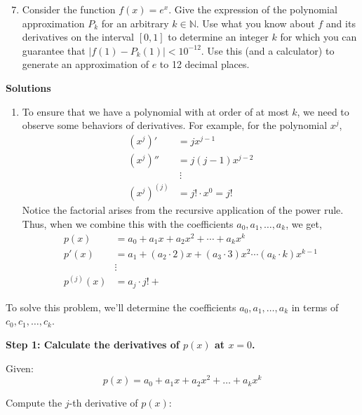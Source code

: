 \documentclass[12pt]{article}
\newcommand{\N}{\ensuremath{\mathbb{N}}}
\begin{document}
\begin{enumerate}
    \setcounter{enumi}{6}
    \item Consider the function \(f(x) = e^{x}\). Give the expression of the polynomial approximation \(P_{k}\) for an arbitrary \(k \in \N\). Use what you know about \(f\) and its derivatives on the interval \([0,1]\) to determine an integer \(k\) for which you can guarantee that \(|f(1) - P_{k}(1)| < 10^{-12}\). Use this (and a calculator) to generate an approximation of \(e\) to 12 decimal places.
\end{enumerate}
\newpage

\begin{center}
    \textbf{Solutions}
\end{center}

\begin{enumerate}
    \item To ensure that we have a polynomial with at order of at most \(k\), we need to observe some behaviors of derivatives. For example, for the polynomial \(x^{j}\), 
    \begin{align*}
        (x^{j})' &= jx^{j - 1} \\
        (x^{j})'' &= j(j - 1)x^{j - 2} \\
        &~\vdots \\
        (x^{j})^{(j)} &= j!\cdot x^{0} = j!
    \end{align*}
    Notice the factorial arises from the recursive application of the power rule. Thus, when we combine this with the coefficients \(a_{0},a_{1},\ldots,a_{k}\), we get, 
    \begin{align*}
        p(x) &= a_0 + a_1 x + a_2 x^2 + \cdots + a_k x^k \\
        p'(x) &= a_{1} + (a_{2} \cdot 2) x + (a_{3} \cdot 3) x^{2} \cdots (a_{k} \cdot k) x^{k - 1} \\
        &\vdots \\
        p^{(j)}(x) &= a_{j} \cdot j! + 
\end{align*}
\end{enumerate}

To solve this problem, we'll determine the coefficients \( a_0, a_1, \dots, a_k \) in terms of \( c_0, c_1, \dots, c_k \).


\textbf{Step 1: Calculate the derivatives of \( p(x) \) at \( x = 0 \).}

Given:
\[
p(x) = a_0 + a_1 x + a_2 x^2 + \dots + a_k x^k
\]

Compute the \( j \)-th derivative of \( p(x) \):
\end{document}

